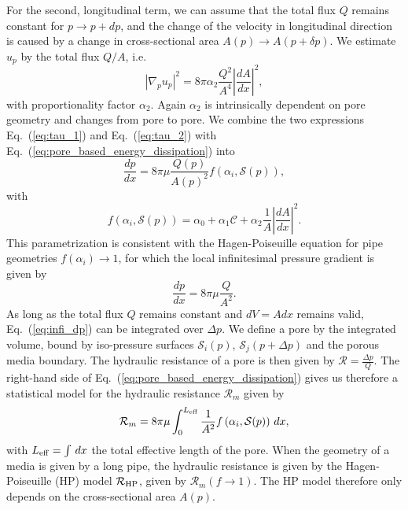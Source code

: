 \documentclass[draft]{agujournal2019}
\begin{document}
For the second, longitudinal term, we can assume that the total flux $Q$ remains constant for $p\rightarrow p+dp$, and the change of the velocity in longitudinal direction is caused by a change in cross-sectional area $A(p)\rightarrow A(p+\delta p)$. We estimate $u_p$ by the total flux $Q/A$, i.e. 
\begin{equation}
	\left|\nabla_p u_p\right|^2 =  8\pi  \alpha_2\frac{Q^2}{A^4}\left|\frac{dA}{dx }\right|^2,\label{eq:tau_2}
\end{equation}
with proportionality factor $\alpha_2$. Again $\alpha_2$ is intrinsically dependent on pore geometry and changes from pore to pore. We combine the two expressions Eq.~(\ref{eq:tau_1}) and Eq.~(\ref{eq:tau_2}) with Eq.~(\ref{eq:pore_based_energy_dissipation}) into
\begin{equation}
	\frac{dp}{dx} = 8\pi \mu \frac{Q(p)}{A(p)^2} f\left(\alpha_i,\mathcal{S}(p) \right),\label{eq:infi_dp}
\end{equation}
with 
\begin{equation}
	 f\left(\alpha_i,\mathcal{S}(p)\right) = \alpha_0+\alpha_1\mathcal{C} + \alpha_2 \frac{1}{A}\left|\frac{d A}{d x}\right|^2.\label{eq:f1}
\end{equation} 	
This parametrization is consistent with the Hagen-Poiseuille equation for pipe geometries $f(\alpha_i)\rightarrow 1$, for which the local infinitesimal pressure gradient is given by 
\begin{equation}
	\frac{d p}{d x} = 8 \pi \mu\frac{Q}{A^2}\label{eq:HP}.
\end{equation} 
As long as the total flux $Q$ remains constant and $dV = Adx$ remains valid, Eq.~(\ref{eq:infi_dp}) can be integrated over $\Delta p$. We define a pore by the integrated volume, bound by iso-pressure surfaces $\mathcal{S}_i(p)$, $\mathcal{S}_j(p+\Delta p)$ and the porous media boundary. The hydraulic resistance of a pore is then given by $\mathcal{R}= \frac{\Delta p}{Q}$. The right-hand side of Eq.~(\ref{eq:pore_based_energy_dissipation}) gives us therefore a statistical model for the hydraulic resistance $\mathcal{R}_m$ given by
\begin{equation}
	\mathcal{R}_m = 8\pi\mu\int^{L_{\rm{eff}}}_{0}\frac{1}{A^2}f\left(\alpha_i,\mathcal{S}(p)\right)\,dx\label{eq:R_model},
\end{equation}
with $L_{\rm{eff}}= \int\,dx $ the total effective length of the pore. When the geometry of a media is given by a long pipe, the hydraulic resistance is given by the Hagen-Poiseuille (HP) model $\mathcal{R}_{\rm{HP}}$, given by $\mathcal{R}_m(f\rightarrow 1)$. The HP model therefore only depends on the cross-sectional area $A(p)$.
\end{document}
